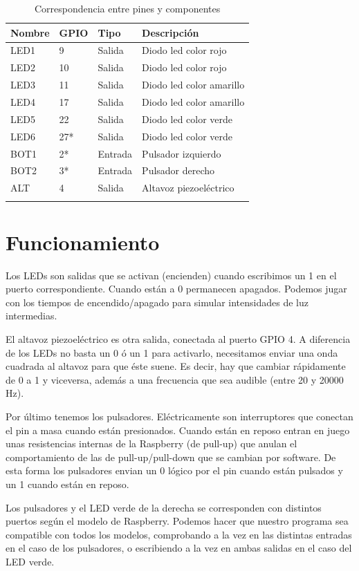 \begin{longtable}{ p{1.8cm} | p{1.2cm} | p{2cm} | p{5cm}}
\hline
{\bf Nombre} & {\bf GPIO} & {\bf Tipo} & {\bf Descripción} \\ \hline
LED1 & 9 & Salida & Diodo led color rojo \\ \hline
LED2 & 10 & Salida & Diodo led color rojo \\ \hline
LED3 & 11 & Salida & Diodo led color amarillo \\ \hline
LED4 & 17 & Salida & Diodo led color amarillo \\ \hline
LED5 & 22 & Salida & Diodo led color verde \\ \hline
LED6 & 27* & Salida & Diodo led color verde \\ \hline
BOT1 & 2* & Entrada & Pulsador izquierdo \\ \hline
BOT2 & 3* & Entrada & Pulsador derecho \\ \hline
ALT & 4 & Salida & Altavoz piezoeléctrico \\ \hline
\caption{Correspondencia entre pines y componentes}
\label{tab:berry}
\end{longtable}

\newpage

\section{Funcionamiento}

Los LEDs son salidas que se activan (encienden) cuando escribimos un 1
en el puerto correspondiente. Cuando están a 0 permanecen apagados. Podemos
jugar con los tiempos de encendido/apagado para simular intensidades de luz
intermedias.

El altavoz piezoeléctrico es otra salida, conectada al puerto GPIO 4. A diferencia
de los LEDs no basta un 0 ó un 1 para activarlo, necesitamos enviar una onda
cuadrada al altavoz para que éste suene. Es decir, hay que cambiar rápidamente de
0 a 1 y viceversa, además a una frecuencia que sea audible (entre 20 y 20000 Hz).

Por último tenemos los pulsadores. Eléctricamente son interruptores que conectan
el pin a masa cuando están presionados. Cuando están en reposo entran en juego
unas resistencias internas de la Raspberry (de pull-up) que anulan el comportamiento de
las de pull-up/pull-down que se cambian por software. De esta forma los pulsadores
envian un 0 lógico por el pin cuando están pulsados y un 1 cuando están en reposo.

Los pulsadores y el LED verde de la derecha se corresponden con
distintos puertos según el modelo de Raspberry. Podemos hacer que nuestro
programa sea compatible con todos los modelos, comprobando a la vez en las distintas
entradas en el caso de los pulsadores, o escribiendo a la vez en ambas salidas
en el caso del LED verde.

